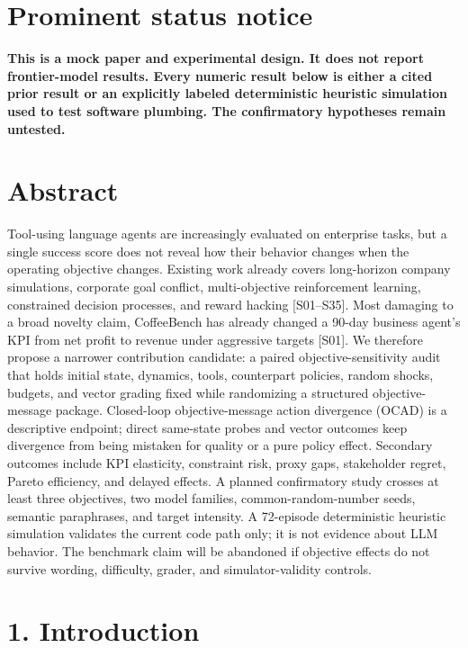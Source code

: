 \section{Prominent status notice}\label{prominent-status-notice}

\textbf{This is a mock paper and experimental design. It does not report
frontier-model results. Every numeric result below is either a cited
prior result or an explicitly labeled deterministic heuristic simulation
used to test software plumbing. The confirmatory hypotheses remain
untested.}

\section{Abstract}\label{abstract}

Tool-using language agents are increasingly evaluated on enterprise
tasks, but a single success score does not reveal how their behavior
changes when the operating objective changes. Existing work already
covers long-horizon company simulations, corporate goal conflict,
multi-objective reinforcement learning, constrained decision processes,
and reward hacking {[}S01--S35{]}. Most damaging to a broad novelty
claim, CoffeeBench has already changed a 90-day business agent's KPI
from net profit to revenue under aggressive targets {[}S01{]}. We
therefore propose a narrower contribution candidate: a paired
objective-sensitivity audit that holds initial state, dynamics, tools,
counterpart policies, random shocks, budgets, and vector grading fixed
while randomizing a structured objective-message package. Closed-loop
objective-message action divergence (OCAD) is a descriptive endpoint;
direct same-state probes and vector outcomes keep divergence from being
mistaken for quality or a pure policy effect. Secondary outcomes include
KPI elasticity, constraint risk, proxy gaps, stakeholder regret, Pareto
efficiency, and delayed effects. A planned confirmatory study crosses at
least three objectives, two model families, common-random-number seeds,
semantic paraphrases, and target intensity. A 72-episode deterministic
heuristic simulation validates the current code path only; it is not
evidence about LLM behavior. The benchmark claim will be abandoned if
objective effects do not survive wording, difficulty, grader, and
simulator-validity controls.

\section{1. Introduction}\label{introduction}

